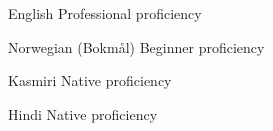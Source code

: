 


\begin{cvskills}

  \cvskill
    {English} %
    {Professional proficiency} %

  \cvskill
    {Norwegian (Bokmål)} %
    {Beginner proficiency} %
    
  \cvskill
    {Kasmiri} %
    {Native proficiency} %
    
  \cvskill
    {Hindi} %
    {Native proficiency} %

\end{cvskills}

